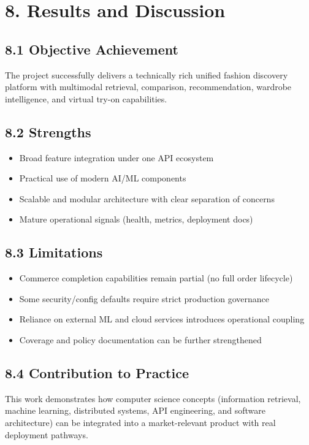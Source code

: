 \documentclass[12pt,a4paper]{report}
\begin{document}
\chapter{8. Results and Discussion}
\section{8.1 Objective Achievement}
The project successfully delivers a technically rich unified fashion discovery platform with multimodal retrieval, comparison, recommendation, wardrobe intelligence, and virtual try-on capabilities.


\section{8.2 Strengths}
\begin{itemize}
\item Broad feature integration under one API ecosystem
\item Practical use of modern AI/ML components
\item Scalable and modular architecture with clear separation of concerns
\item Mature operational signals (health, metrics, deployment docs)
\end{itemize}

\section{8.3 Limitations}
\begin{itemize}
\item Commerce completion capabilities remain partial (no full order lifecycle)
\item Some security/config defaults require strict production governance
\item Reliance on external ML and cloud services introduces operational coupling
\item Coverage and policy documentation can be further strengthened
\end{itemize}

\section{8.4 Contribution to Practice}
This work demonstrates how computer science concepts (information retrieval, machine learning, distributed systems, API engineering, and software architecture) can be integrated into a market-relevant product with real deployment pathways.
\end{document}
